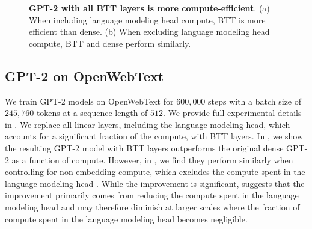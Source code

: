 \documentclass{article}
\theoremstyle{plain}
\theoremstyle{definition}
\theoremstyle{remark}
\begin{document}
\begin{figure}[!t]
\centering
   \caption{
   \textbf{GPT-2 with all BTT layers is more compute-efficient}. (a) When including language modeling head compute, BTT is more efficient than dense. (b) When excluding language modeling head compute, BTT and dense perform similarly. 
   }
    \label{fig:gpt2}
    \vspace{-2mm}
\end{figure}

\subsection{GPT-2 on OpenWebText}
%
We train GPT-2 models on OpenWebText for $600,000$ steps with a batch size of $245,760$ tokens at a sequence length of $512. $ We provide full experimental details in . We replace all linear layers, including the language modeling head, which accounts for a significant fraction of the compute, with BTT layers.
In , we show the resulting GPT-2 model with BTT layers outperforms the original dense GPT-2 as a function of compute. However, in , we find they perform similarly when controlling for non-embedding compute, which excludes the compute spent in the language modeling head \citep{kaplan2020scaling}. While the improvement is significant,  suggests that the improvement primarily comes from reducing the compute spent in the language modeling head and may therefore diminish at larger scales where the fraction of compute spent in the language modeling head becomes negligible.
\end{document}

